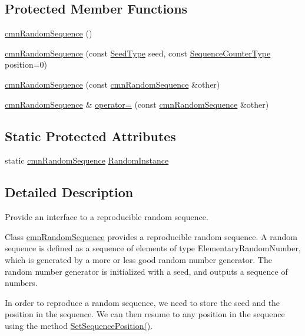 \subsection*{Protected Member Functions}
\begin{DoxyCompactItemize}
\item 
\hyperlink{classcmn_random_sequence_ac2e1ccceb37bb3e42d1fc3148a564a30}{cmn\-Random\-Sequence} ()
\item 
\hyperlink{classcmn_random_sequence_a3d9618b02b6602c933d61cb824d2ec9b}{cmn\-Random\-Sequence} (const \hyperlink{classcmn_random_sequence_a7b97009536ce38559fa5fb86a9eea16d}{Seed\-Type} seed, const \hyperlink{classcmn_random_sequence_ac3befd667513146020ef266429e205b0}{Sequence\-Counter\-Type} position=0)
\item 
\hyperlink{classcmn_random_sequence_ab68b8fc9eab0f1930a65ee1e1bd9af74}{cmn\-Random\-Sequence} (const \hyperlink{classcmn_random_sequence}{cmn\-Random\-Sequence} \&other)
\item 
\hyperlink{classcmn_random_sequence}{cmn\-Random\-Sequence} \& \hyperlink{classcmn_random_sequence_a38c6f005dd81ae091b56d59541ed091f}{operator=} (const \hyperlink{classcmn_random_sequence}{cmn\-Random\-Sequence} \&other)
\end{DoxyCompactItemize}
\subsection*{Static Protected Attributes}
\begin{DoxyCompactItemize}
\item 
static \hyperlink{classcmn_random_sequence}{cmn\-Random\-Sequence} \hyperlink{classcmn_random_sequence_a04d180901d880761b49e6c61b79423f3}{Random\-Instance}
\end{DoxyCompactItemize}


\subsection{Detailed Description}
Provide an interface to a reproducible random sequence. 

Class \hyperlink{classcmn_random_sequence}{cmn\-Random\-Sequence} provides a reproducible random sequence. A random sequence is defined as a sequence of elements of type Elementary\-Random\-Number, which is generated by a more or less good random number generator. The random number generator is initialized with a seed, and outputs a sequence of numbers.

In order to reproduce a random sequence, we need to store the seed and the position in the sequence. We can then resume to any position in the sequence using the method \hyperlink{classcmn_random_sequence_aa3dacc3e54ded2e0b55e78e460f1bd0d}{Set\-Sequence\-Position()}.

